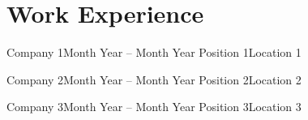 \section{Work Experience}
    \resumeSubHeadingListStart


  \resumeSubheading
  {Company 1}{Month Year -- Month Year}
  {Position 1}{Location 1}
    \resumeItemListStart
    \resumeItemListEnd

  \resumeSubheading
  {Company 2}{Month Year -- Month Year}
  {Position 2}{Location 2}
    \resumeItemListStart
    \resumeItemListEnd

  \resumeSubheading
  {Company 3}{Month Year -- Month Year}
  {Position 3}{Location 3}
    \resumeItemListStart
    \resumeItemListEnd

  \resumeSubHeadingListEnd